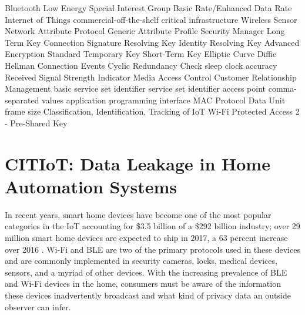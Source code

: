 \documentclass[12pt,letterpaper,oneside]{book}
\begin{document}
	\begin{acronym}
		 {Bluetooth Low Energy}
		 {Special Interest Group}
		 {Basic Rate/Enhanced Data Rate}
		 {Internet of Things}
		 {commercial-off-the-shelf}
		 {critical infrastructure}
		 {Wireless Sensor Network}
		 {Attribute Protocol}
		 {Generic Attribute Profile}
		 {Security Manager}
		 {Long Term Key}
		 {Connection Signature Resolving Key}
		 {Identity Resolving Key}
		 {Advanced Encryption Standard}
		 {Temporary Key}
		 {Short-Term Key}
		 {Elliptic Curve Diffie Hellman}
		 {Connection Events}
		 {Cyclic Redundancy Check}
		 {sleep clock accuracy}
		 {Received Signal Strength Indicator}
		 {Media Access Control}
		 {Customer Relationship Management}
		 {basic service set identifier}
		 {service set identifier}
		 {access point}
		 {comma-separated values}
		 {application programming interface}
		 {MAC Protocol Data Unit}
		 {frame size}
		 {Classification, Identification, Tracking of IoT}
		 {Wi-Fi Protected Access 2 - Pre-Shared Key}
	\end{acronym}
\mainmatter
\section{CITIoT: Data Leakage in Home Automation Systems}
In recent years, smart home devices have become one of the most popular categories in the \ac{IoT} accounting for \$3.5 billion of a \$292 billion industry; over 29 million smart home devices are expected to ship in 2017, a 63 percent increase over 2016 \cite{consumerTech}. Wi-Fi and \ac{BLE} are two of the primary protocols used in these devices and are commonly implemented in security cameras, locks, medical devices, sensors, and a myriad of other devices. With the increasing prevalence of \ac{BLE} and Wi-Fi devices in the home, consumers must be aware of the information these devices inadvertently broadcast and what kind of privacy data an outside observer can infer. 
\end{document}
